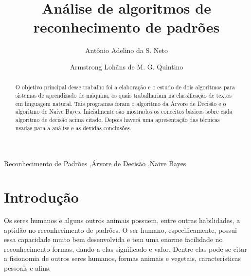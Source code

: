 \documentclass[preprint,12pt,times]{elsarticle}
\begin{document}
	\begin{frontmatter}



		\title{Análise de algoritmos de reconhecimento de padrões}
				
		\author[a]{Antônio Adelino da S. Neto}
		\address[a]{antonio.asn03@gmail.com}
		
		\author[b]{Armstrong Lohãns de M. G. Quintino}
		\address[b]{lohansdemelo1108@gmail.com}
		
		\address{Garanhuns, Brasil}

		\begin{abstract}
			O objetivo principal desse trabalho foi a elaboração e o estudo de dois algoritmos para sistemas de aprendizado de máquina, os quais trabalhariam na classificação de textos em linguagem natural. Tais programas foram o algoritmo da Árvore de Decisão e o algoritmo de Naive Bayes. Inicialmente são mostrados os conceitos básicos sobre cada algoritmo de decisão acima citado. Depois haverá uma apresentação das técnicas usadas para a análise e as devidas conclusões.
		\end{abstract}

		\begin{keyword}
			Reconhecimento de Padrões \sep Árvore de Decisão \sep Naive Bayes
		\end{keyword}

	\end{frontmatter}

	\linenumbers

	\section{Introdução}
	\label{Introdução}
	Os seres humanos e alguns outros animais possuem, entre outras habilidades, a aptidão no reconhecimento de padrões. O ser humano, especificamente, possui essa capacidade muito bem desenvolvida e tem uma enorme facilidade no reconhecimento formas, dando a elas significado e valor. Dentre elas pode-se citar a fisionomia de outros seres humanos, formas animais e vegetais, características pessoais e afins.
\end{document}
